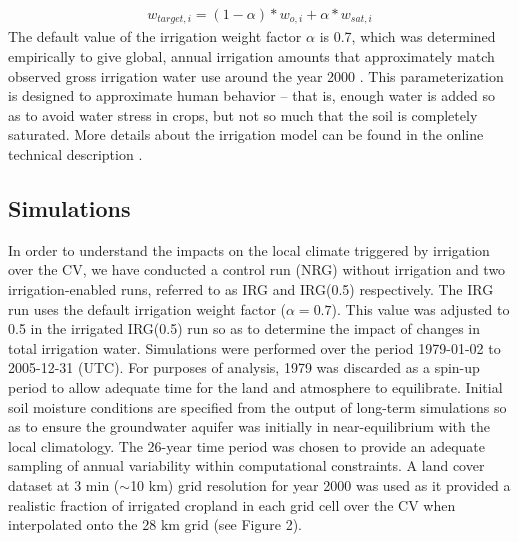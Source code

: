 \begin{align} \label{eq:TargetSoilMoisture}
w_{target,i} = (1-{\alpha})*w_{o,i} + {\alpha}*w_{sat,i}
\end{align} The default value of the irrigation weight factor $\alpha$ is 0.7, which was determined empirically to give global, annual irrigation amounts that approximately match observed gross irrigation water use around the year 2000 \cite{shiklomanov2000appraisal}. This parameterization is designed to approximate human behavior -- that is, enough water is added so as to avoid water stress in crops, but not so much that the soil is completely saturated. More details about the irrigation model can be found in the online technical description \cite{irrigationTechnicCLM}.

\subsection{Simulations}

In order to understand the impacts on the local climate triggered by irrigation over the CV, we have conducted a control run (NRG) without irrigation and two irrigation-enabled runs, referred to as IRG and IRG(0.5) respectively. The IRG run uses the default irrigation weight factor ($\alpha = 0.7$).  This value was adjusted to 0.5 in the irrigated IRG(0.5) run so as to determine the impact of changes in total irrigation water. Simulations were performed over the period 1979-01-02 to 2005-12-31 (UTC).  For purposes of analysis, 1979 was discarded as a spin-up period to allow adequate time for the land and atmosphere to equilibrate.  Initial soil moisture conditions are specified from the output of long-term simulations so as to ensure the groundwater aquifer was initially in near-equilibrium with the local climatology. The 26-year time period was chosen to provide an adequate sampling of annual variability within computational constraints. A land cover dataset at 3 min ($\sim$10 km) grid resolution for year 2000 was used as it provided a realistic fraction of irrigated cropland in each grid cell over the CV when interpolated onto the 28 km grid (see Figure 2). 

